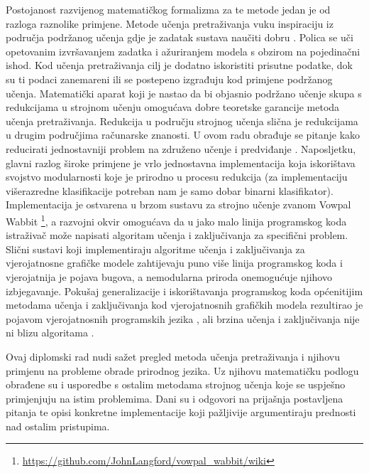 Postojanost razvijenog matematičkog formalizma za te metode jedan je od razloga
raznolike primjene. Metode učenja pretraživanja vuku inspiraciju iz područja
podržanog učenja  gdje je zadatak sustava naučiti
dobru .
Polica se uči opetovanim izvršavanjem zadatka i ažuriranjem modela s obzirom na
pojedinačni ishod. Kod učenja pretraživanja cilj je dodatno iskoristiti prisutne
podatke, dok su ti podaci zanemareni ili se postepeno izgrađuju kod primjene
podržanog učenja. Matematički aparat koji je nastao da bi objasnio podržano
učenje skupa s redukcijama u strojnom učenju  omogućava dobre teoretske garancije metoda učenja pretraživanja.
Redukcija u području strojnog učenja slična je redukcijama u drugim područjima
računarske znanosti. U ovom radu obrađuje se pitanje kako reducirati
jednostavniji problem na združeno učenje i predviđanje . Naposljetku, glavni razlog široke primjene je vrlo jednostavna
implementacija koja iskorištava svojstvo modularnosti koje je prirodno u procesu
redukcija (za implementaciju višerazredne klasifikacije potreban nam je samo
dobar binarni klasifikator). Implementacija je ostvarena u brzom sustavu za
strojno učenje zvanom Vowpal Wabbit
\footnote{\url{https://github.com/JohnLangford/vowpal_wabbit/wiki}}, a \lts{}
razvojni okvir omogućava da u jako malo linija programskog koda istraživač može
napisati algoritam učenja i zaključivanja za specifični problem. Slični sustavi
koji implementiraju algoritme učenja i zaključivanja za vjerojatnosne grafičke
modele zahtijevaju puno više linija programskog koda i vjerojatnija je pojava
bugova, a nemodularna priroda onemogućuje njihovo izbjegavanje. Pokušaj
generalizacije i iskorištavanja programskog koda općenitijim metodama učenja i
zaključivanja kod vjerojatnosnih grafičkih modela rezultirao je pojavom
vjerojatnosnih programskih jezika ,
ali brzina učenja i zaključivanja nije ni blizu algoritama \lts{}.

Ovaj diplomski rad nudi sažet pregled metoda učenja pretraživanja i njihovu
primjenu na probleme obrade prirodnog jezika. Uz njihovu matematičku podlogu
obrađene su i usporedbe s ostalim metodama strojnog učenja koje se uspješno
primjenjuju na istim problemima. Dani su i odgovori na prijašnja postavljena
pitanja te opisi konkretne implementacije koji pažljivije argumentiraju
prednosti nad ostalim pristupima.

